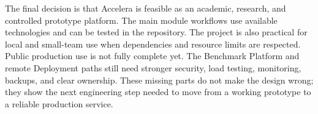 \documentclass[12pt,a4paper]{report}
\begin{document}
The final decision is that Accelera is feasible as an academic, research, and
controlled prototype platform. The main module workflows use available
technologies and can be tested in the repository. The project is also practical
for local and small-team use when dependencies and resource limits are respected.
Public production use is not fully complete yet. The Benchmark Platform and
remote Deployment paths still need stronger security, load testing, monitoring,
backups, and clear ownership. These missing parts do not make the design wrong;
they show the next engineering step needed to move from a working prototype to a
reliable production service.
\end{document}
